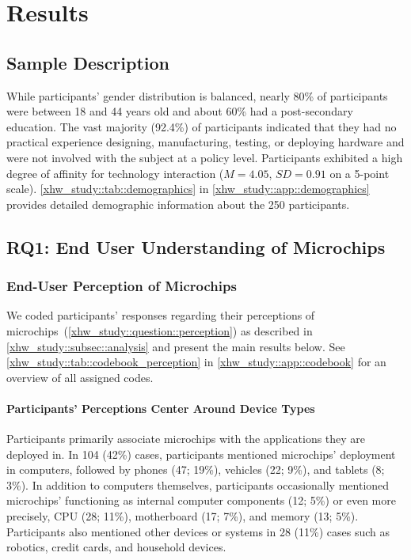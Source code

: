 \section{Results}
\label{xhw_study::sec::results}

\subsection{Sample Description}
\label{xhw_study::subsec::sample}
While participants' gender distribution is balanced, nearly 80\% of participants were between 18 and 44 years old and about 60\% had a post-secondary education.
The vast majority (92.4\%) of participants indicated that they had no practical experience designing, manufacturing, testing, or deploying hardware and were not involved with the subject at a policy level.
Participants exhibited a high degree of affinity for technology interaction ($M$$=$$4.05$, $SD$$=$$0.91$ on a 5-point scale).
\autoref{xhw_study::tab::demographics} in \autoref{xhw_study::app::demographics} provides detailed demographic information about the 250 participants.


\subsection{RQ1: End User Understanding of Microchips}
\label{xhw_study::subsec::coding_results}

\subsubsection{End-User Perception of Microchips}
\label{xhw_study::subsubsec::perceptions}
We coded participants' responses regarding their perceptions of microchips~(\autoref{xhw_study::question::perception}) as described in \autoref{xhw_study::subsec::analysis} and present the main results below.
See \autoref{xhw_study::tab::codebook_perception} in \autoref{xhw_study::app::codebook} for an overview of all assigned codes.

\paragraph{Participants' Perceptions Center Around Device Types} 
Participants primarily associate microchips with the applications they are deployed in. 
In 104 (42\%) cases, participants mentioned microchips' deployment in computers, followed by phones (47; 19\%), vehicles (22; 9\%), and tablets (8; 3\%). 
In addition to computers themselves, participants occasionally mentioned microchips' functioning as internal computer components (12; 5\%) or even more precisely, CPU (28; 11\%), motherboard (17; 7\%), and memory (13; 5\%). 
Participants also mentioned other devices or systems in 28 (11\%) cases such as robotics, credit cards, and household devices. 


